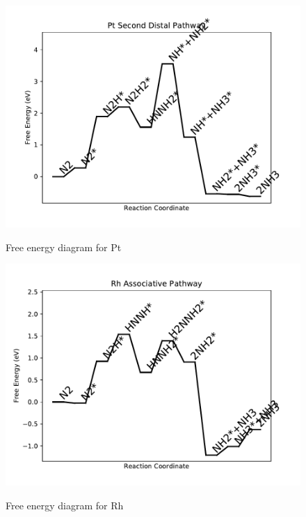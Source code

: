 \documentclass{article}
\begin{document}
\begin{figure}
\includegraphics[width=1\linewidth]{data/plots/Pt_distal_2.pdf}
\label{fig:Pt_distal_2}
\caption{Free energy diagram for Pt}
\end{figure}

\begin{figure}
\includegraphics[width=1\linewidth]{data/plots/Rh_associative.pdf}
\label{fig:Rh_associative}
\caption{Free energy diagram for Rh}
\end{figure}
\end{document}
